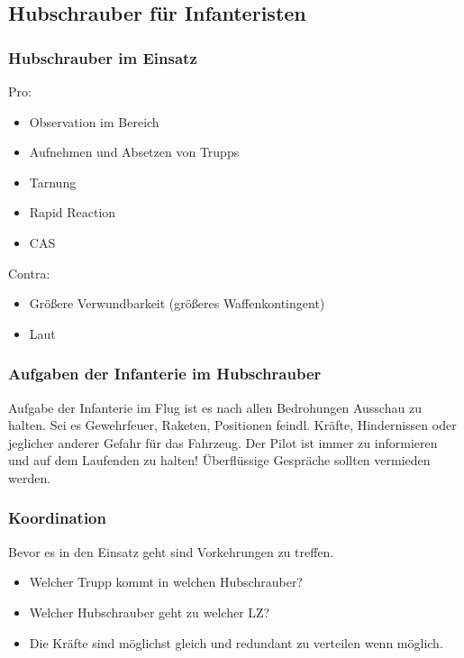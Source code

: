\newpage

\subsection{Hubschrauber für Infanteristen}
\label{HuFIn}

\subsubsection{Hubschrauber im Einsatz}
	Pro: 
		\begin{itemize}
			\item Observation im Bereich
			\item Aufnehmen und Absetzen von Trupps
			\item Tarnung
			\item Rapid Reaction
			\item \ac{CAS}
		\end{itemize}

	Contra: 
		\begin{itemize} 
			\item Größere Verwundbarkeit (größeres Waffenkontingent)
			\item Laut
		\end{itemize}

\subsubsection{Aufgaben der Infanterie im Hubschrauber}
	Aufgabe der Infanterie im Flug ist es nach allen Bedrohungen Ausschau zu halten. Sei es Gewehrfeuer, Raketen, Positionen feindl. Kräfte, Hindernissen oder jeglicher anderer Gefahr für das Fahrzeug. Der Pilot ist immer zu informieren und auf dem Laufenden zu halten! Überflüssige Gespräche sollten vermieden werden.

\subsubsection{Koordination}
	Bevor es in den Einsatz geht sind Vorkehrungen zu treffen. 
		\begin{itemize} 
			\item Welcher Trupp kommt in welchen Hubschrauber? 
			\item Welcher Hubschrauber geht zu welcher \ac{LZ}? 	
			\item Die Kräfte sind möglichst gleich und redundant zu verteilen wenn möglich.
		\end{itemize}

